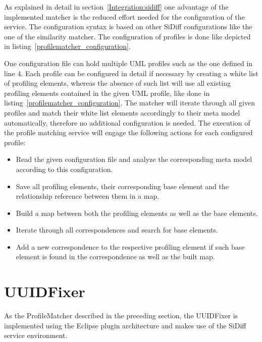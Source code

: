As explained in detail in section~\ref{Integration:sidiff} one advantage of the
implemented matcher is the reduced effort needed for the configuration of
the service. The configuration syntax is based on other SiDiff
configurations like the one of the similarity matcher. The configuration of profiles is done like
depicted in listing~\ref{profilematcher_configuration}.



One configuration file can hold multiple \ac{UML} profiles such as the one
defined in line 4. Each profile can be configured in detail if necessary by
creating a white list of profiling elements, whereas the absence of such list
will use all existing profiling elements contained in the given \ac{UML}
profile, like done in listing~\ref{profilematcher_configuration}. The
matcher will iterate through all given profiles and match their white list
elements accordingly to their meta model automatically, therefore no additional
configuration is needed. The execution of the profile matching service will
engage the following actions for each configured profile:
\begin{itemize}
  \item Read the given configuration file and analyze the corresponding meta
  model according to this configuration.
  \item Save all profiling elements, their corresponding base element and the
  relationship reference between them in a map. 
  \item Build a map between both the profiling elements as well as the base
  elements.
  \item Iterate through all correspondences and search for base elements.
  \item Add a new correspondence to the respective profiling element if such
  base element is found in the correspondence as well as the built map.
\end{itemize}
\section{UUIDFixer}\label{realization:uuidfixer}
As the ProfileMatcher described in the preceding section, the \ac{UUID}Fixer is
implemented using the Eclipse plugin architecture and makes use of the SiDiff
service environment. 

